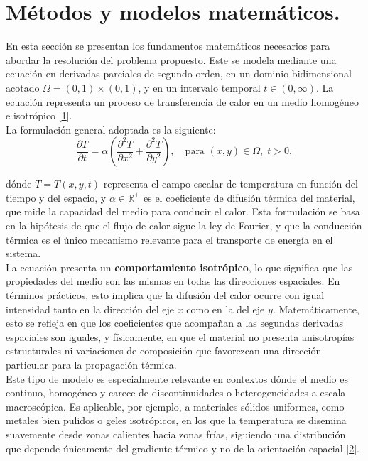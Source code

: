 \documentclass{article}
\begin{document}
\newpage
\section{Métodos y modelos matemáticos.}
En esta sección se presentan los fundamentos matemáticos necesarios para abordar la resolución del problema propuesto. Este se modela mediante una ecuación en derivadas parciales de segundo orden, en un dominio bidimensional acotado $\Omega = (0,1) \times (0,1)$, y en un intervalo temporal $t \in (0, \infty)$. La ecuación representa un proceso de transferencia de calor en un medio homogéneo e isotrópico [\href{https://diposit.ub.edu/dspace/bitstream/2445/211361/1/tfg_iglesias_diaz_angel.pdf}{1}].\\

La formulación general adoptada es la siguiente:
\begin{equation}
    \frac{\partial T}{\partial t} = \alpha \left( \frac{\partial^2 T}{\partial x^2} + \frac{\partial^2 T}{\partial y^2} \right), \quad \text{para } (x, y) \in \Omega,\; t > 0,
\end{equation}

dónde $T = T(x, y, t)$ representa el campo escalar de temperatura en función del tiempo y del espacio, y $\alpha \in \mathbb{R}^+$ es el coeficiente de difusión térmica del material, que mide la capacidad del medio para conducir el calor. Esta formulación se basa en la hipótesis de que el flujo de calor sigue la ley de Fourier, y que la conducción térmica es el único mecanismo relevante para el transporte de energía en el sistema.\\

La ecuación presenta un \textbf{comportamiento isotrópico}, lo que significa que las propiedades del medio son las mismas en todas las direcciones espaciales. En términos prácticos, esto implica que la difusión del calor ocurre con igual intensidad tanto en la dirección del eje $x$ como en la del eje $y$. Matemáticamente, esto se refleja en que los coeficientes que acompañan a las segundas derivadas espaciales son iguales, y físicamente, en que el material no presenta anisotropías estructurales ni variaciones de composición que favorezcan una dirección particular para la propagación térmica.\\

Este tipo de modelo es especialmente relevante en contextos dónde el medio es continuo, homogéneo y carece de discontinuidades o heterogeneidades a escala macroscópica. Es aplicable, por ejemplo, a materiales sólidos uniformes, como metales bien pulidos o geles isotrópicos, en los que la temperatura se disemina suavemente desde zonas calientes hacia zonas frías, siguiendo una distribución que depende únicamente del gradiente térmico y no de la orientación espacial [\href{https://es.wikipedia.org/wiki/Ecuaci%C3%B3n_del_calor}{2}].
\end{document}
